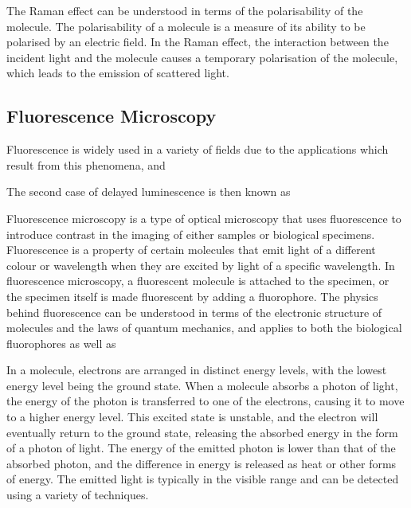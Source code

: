 The Raman effect can be understood in terms of the polarisability of the molecule. The polarisability of a molecule is a measure of its ability to be polarised by an electric field. In the Raman effect, the interaction between the incident light and the molecule causes a temporary polarisation of the molecule, which leads to the emission of scattered light.


\subsection{Fluorescence Microscopy}%


Fluorescence is widely used in a variety of fields due to the applications which result from this phenomena, and 

The second case of delayed luminescence is then known as 

Fluorescence microscopy is a type of optical microscopy that uses fluorescence to introduce contrast in the imaging of either samples or biological specimens. Fluorescence is a property of certain molecules that emit light of a different colour or wavelength when they are excited by light of a specific wavelength. In fluorescence microscopy, a fluorescent molecule is attached to the specimen, or the specimen itself is made fluorescent by adding a fluorophore. The physics behind fluorescence can be understood in terms of the electronic structure of molecules and the laws of quantum mechanics, and applies to both the biological fluorophores as well as 

In a molecule, electrons are arranged in distinct energy levels, with the lowest energy level being the ground state. When a molecule absorbs a photon of light, the energy of the photon is transferred to one of the electrons, causing it to move to a higher energy level. This excited state is unstable, and the electron will eventually return to the ground state, releasing the absorbed energy in the form of a photon of light. The energy of the emitted photon is lower than that of the absorbed photon, and the difference in energy is released as heat or other forms of energy. The emitted light is typically in the visible range and can be detected using a variety of techniques.